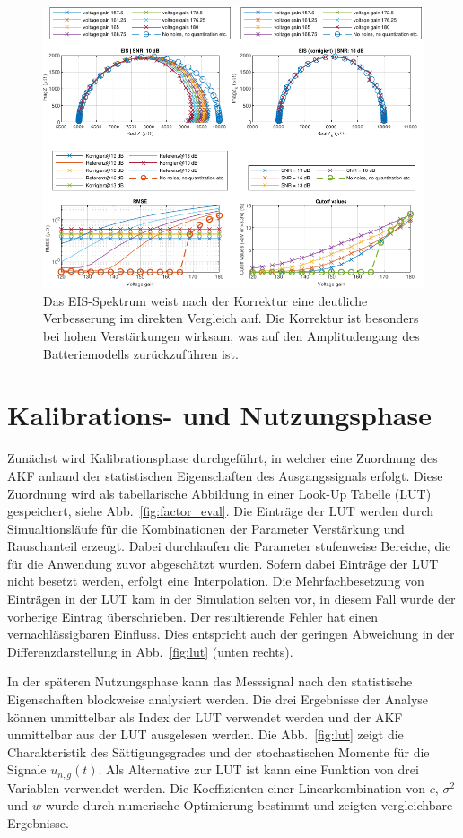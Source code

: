 \begin{figure}[t!]
	\centering
	\includegraphics[width=.9\textwidth]{../img/ergebnisse.pdf}
	\caption{Das EIS-Spektrum weist nach der Korrektur eine deutliche Verbesserung im direkten Vergleich auf. Die Korrektur ist besonders bei hohen Verstärkungen wirksam, was auf den Amplitudengang des Batteriemodells zurückzuführen ist.}
	\label{fig:Ergebnisse} 
\end{figure}

\section{Kalibrations- und Nutzungsphase}


Zunächst wird Kalibrationsphase durchgeführt, in welcher eine Zuordnung des AKF anhand der statistischen Eigenschaften des Ausgangssignals erfolgt. Diese Zuordnung wird als tabellarische Abbildung in einer Look-Up Tabelle (LUT) gespeichert, siehe Abb.~\ref{fig:factor_eval}. 
Die Einträge der LUT werden durch Simualtionsläufe für die Kombinationen der Parameter Verstärkung und Rauschanteil erzeugt. Dabei durchlaufen die Parameter stufenweise Bereiche, die für die Anwendung zuvor abgeschätzt wurden. Sofern dabei Einträge der LUT nicht besetzt werden, erfolgt eine Interpolation. %
Die Mehrfachbesetzung von Einträgen in der LUT kam in der Simulation selten vor, in diesem Fall wurde der vorherige Eintrag überschrieben. Der resultierende Fehler hat einen vernachlässigbaren Einfluss. Dies entspricht auch der geringen Abweichung in der Differenzdarstellung in Abb.~\ref{fig:lut} (unten rechts). 

In der späteren Nutzungsphase kann das Messsignal nach den statistische Eigenschaften blockweise analysiert werden. Die drei Ergebnisse der Analyse können unmittelbar als Index der LUT verwendet werden und der AKF unmittelbar aus der LUT ausgelesen werden. Die Abb.~\ref{fig:lut} zeigt die Charakteristik des Sättigungsgrades und der stochastischen Momente für die Signale $u_{n,g}(t)$. Als Alternative zur LUT ist kann eine Funktion von drei Variablen verwendet werden. Die Koeffizienten einer Linearkombination von $c$, $\sigma^2$ und $w$ wurde durch numerische Optimierung bestimmt und zeigten vergleichbare Ergebnisse.

